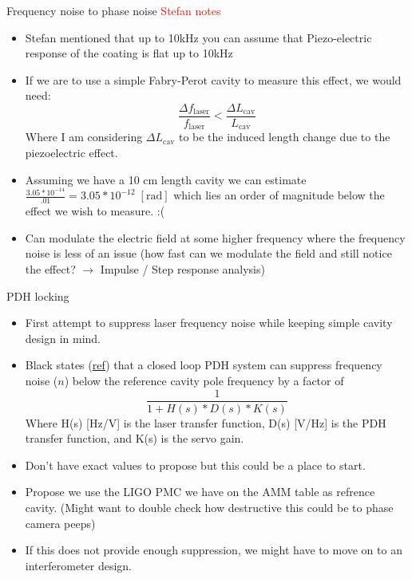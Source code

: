 \documentclass{beamer}
\begin{document}
\begin{frame}{Frequency noise to phase noise \textcolor{red}{Stefan notes}}
\begin{itemize}
  \item Stefan mentioned that up to 10kHz you can assume that Piezo-electric response of the coating is flat up to 10kHz
  \item If we are to use a simple Fabry-Perot cavity to measure this effect, we would need:
$$\frac{\Delta f_{\mathrm{laser}}}{f_{\mathrm{laser}}}< \frac{\Delta L_{\mathrm{cav}}}{L_{\mathrm{cav}}}$$
Where I am considering $\Delta L_{\mathrm{cav}}$ to be the induced length change due to the piezoelectric effect.
  \item Assuming we have a 10 cm length cavity we can estimate $\frac{3.05*10^{-14}}{.01} = 3.05*10^{-12}\; [\mathrm{rad}]$ which lies an order of magnitude below the effect we wish to measure. :(
  \item Can modulate the electric field at some higher frequency where the frequency noise is less of an issue (how fast can we modulate the field and still notice the effect? $\rightarrow$ Impulse / Step response analysis)
\end{itemize}

\end{frame}

\begin{frame}{PDH locking}

\begin{itemize}
  \item First attempt to suppress laser frequency noise while keeping simple cavity design in mind.
  \item Black states (\href{https://youtu.be/tX884B8GrEE}{ref}) that a closed loop PDH system can suppress frequency noise ($n$) below the reference cavity pole frequency by a factor of $$\frac{1}{1 + H(s)*D(s)*K(s)}$$
Where H(s) [Hz/V] is the laser transfer function, D(s) [V/Hz] is the PDH transfer function, and K(s) is the servo gain.
  \item Don’t have exact values to propose but this could be a place to start.
  \item Propose we use the LIGO PMC we have on the AMM table as refrence cavity. (Might want to double check how destructive this could be to phase camera peeps)
  \item If this does not provide enough suppression, we might have to move on to an interferometer design.

\end{itemize}
\end{frame}
\end{document}
